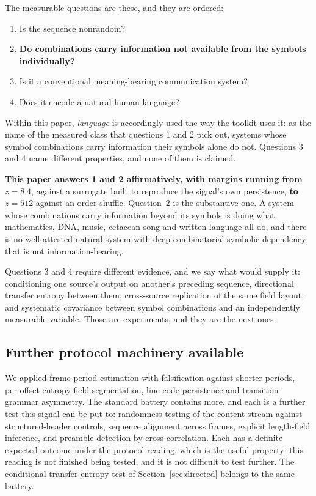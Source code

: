 \documentclass[11pt,a4paper]{article}
\begin{document}
The measurable questions are these, and they are ordered:
\begin{enumerate}[leftmargin=1.6em,itemsep=1pt]
\item Is the sequence nonrandom?
\item \textbf{Do combinations carry information not available from the symbols
individually?}
\item Is it a conventional meaning-bearing communication system?
\item Does it encode a natural human language?
\end{enumerate}

Within this paper, \emph{language} is accordingly used the way the toolkit uses it: as
the name of the measured class that questions 1 and 2 pick out, systems whose symbol
combinations carry information their symbols alone do not. Questions 3 and 4 name
different properties, and none of them is claimed.

\textbf{This paper answers 1 and 2 affirmatively, with margins running from} $z = 8.4$,
against a surrogate built to reproduce the signal's own persistence, \textbf{to}
$z = 512$ against an order shuffle. Question~2 is the substantive one. A system whose combinations carry
information beyond its symbols is doing what mathematics, DNA, music, cetacean song and
written language all do, and there is no well-attested natural system with deep
combinatorial symbolic dependency that is not information-bearing.

Questions 3 and 4 require different evidence, and we say what would supply it:
conditioning one source's output on another's preceding sequence, directional transfer
entropy between them, cross-source replication of the same field layout, and systematic
covariance between symbol combinations and an independently measurable variable. Those
are experiments, and they are the next ones.

\subsection{Further protocol machinery available}
\label{sec:further}

We applied frame-period estimation with falsification against shorter periods,
per-offset entropy field segmentation, line-code persistence and
transition-grammar asymmetry. The standard battery contains more, and each is a further
test this signal can be put to: randomness testing of the content stream against
structured-header controls, sequence alignment across frames, explicit length-field
inference, and preamble detection by cross-correlation. Each has a definite expected
outcome under the protocol reading, which is the useful property: this reading is not
finished being tested, and it is not difficult to test further. The conditional
transfer-entropy test of Section~\ref{sec:directed} belongs to the same battery.
\end{document}
